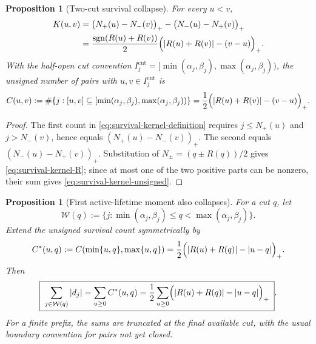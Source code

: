 \documentclass[11pt]{amsart}
\numberwithin{equation}{section}
\theoremstyle{plain}
\newtheorem{proposition}[theorem]{Proposition}
\theoremstyle{definition}
\theoremstyle{remark}
\begin{document}
\begin{proposition}[Two-cut survival collapse]
\label{prop:survival-kernel-collapse}
For every $u<v$,
\begin{align}
K(u,v)
&=\bigl(N_+(u)-N_-(v)\bigr)_+
 -\bigl(N_-(u)-N_+(v)\bigr)_+
\label{eq:survival-kernel-counters}\\
&=\frac{\operatorname{sgn}(R(u)+R(v))}{2}
\Bigl(|R(u)+R(v)|-(v-u)\Bigr)_+.
\label{eq:survival-kernel-R}
\end{align}
With the half-open cut convention $I_j^{\mathrm{cut}}
=[\min(\alpha_j,\beta_j),\max(\alpha_j,\beta_j))$, the unsigned number of pairs
with $u,v\in I_j^{\mathrm{cut}}$ is
\begin{equation}
\label{eq:survival-kernel-unsigned}
C(u,v):=\#\{j:[u,v]\subseteq
[\min(\alpha_j,\beta_j),\max(\alpha_j,\beta_j))\}
=\frac12\Bigl(|R(u)+R(v)|-(v-u)\Bigr)_+.
\end{equation}
\end{proposition}

\begin{proof}
The first count in \eqref{eq:survival-kernel-definition} requires
$j\le N_+(u)$ and $j>N_-(v)$, hence equals
$(N_+(u)-N_-(v))_+$.  The second equals
$(N_-(u)-N_+(v))_+$.  Substitution of
$N_\pm=(q\pm R(q))/2$ gives \eqref{eq:survival-kernel-R}; since at most one
of the two positive parts can be nonzero, their sum gives
\eqref{eq:survival-kernel-unsigned}.
\end{proof}

\begin{proposition}[First active-lifetime moment also collapses]
\label{prop:active-lifetime-first-moment}
For a cut $q$, let
\begin{equation}
\label{eq:active-cut-set}
\mathcal W(q):=\{j:\min(\alpha_j,\beta_j)\le q<\max(\alpha_j,\beta_j)\}.
\end{equation}
Extend the unsigned survival count symmetrically by
\begin{equation}
\label{eq:Cstar-definition}
C^*(u,q):=C(\min\{u,q\},\max\{u,q\})
=\frac12\Bigl(|R(u)+R(q)|-|u-q|\Bigr)_+.
\end{equation}
Then
\begin{equation}
\label{eq:active-first-moment-collapse}
\boxed{\;
\sum_{j\in\mathcal W(q)}|d_j|
=\sum_{u\ge0} C^*(u,q)
=\frac12\sum_{u\ge0}
\Bigl(|R(u)+R(q)|-|u-q|\Bigr)_+
\;}.
\end{equation}
For a finite prefix, the sums are truncated at the final available cut, with the
usual boundary convention for pairs not yet closed.
\end{proposition}
\end{document}
